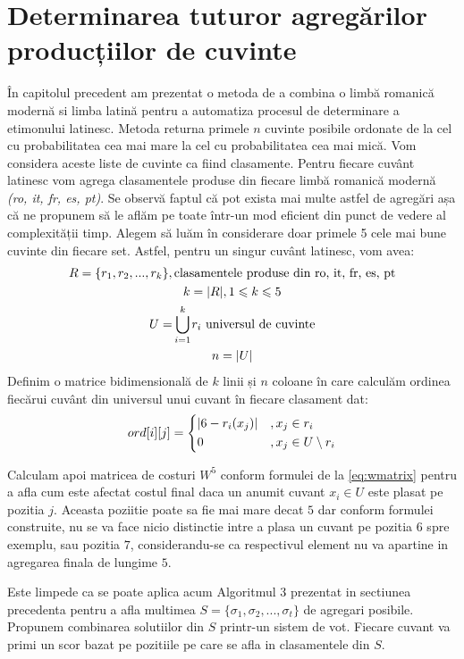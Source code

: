 \section{Determinarea tuturor agregărilor producțiilor de cuvinte}
În capitolul precedent am prezentat o metoda de a combina o limbă romanică modernă si limba latină
pentru a automatiza procesul de determinare a etimonului latinesc. Metoda returna primele $n$
cuvinte posibile ordonate de la cel cu probabilitatea cea mai mare la cel cu probabilitatea cea mai
mică. Vom considera aceste liste de cuvinte ca fiind clasamente. Pentru fiecare cuvânt latinesc vom
agrega clasamentele produse din fiecare limbă romanică modernă \textit{(ro, it, fr, es, pt)}.
Se observă faptul că pot exista mai multe astfel de agregări așa că ne propunem să le aflăm pe toate
într-un mod eficient din punct de vedere al complexității timp. Alegem să luăm în considerare
doar primele 5 cele mai bune cuvinte din fiecare set. Astfel, pentru un singur cuvânt latinesc, vom 
avea:
\begin{gather*}
  R = \{r_1, r_2, ..., r_k\}, \text{clasamentele produse din ro, it, fr, es, pt} \\
  k = |R|, 1 \leqslant k \leqslant 5 \\
  U = \smashoperator{\bigcup_{i = 1}^{k}} r_i \text{ universul de cuvinte} \\
  n = |U|
\end{gather*}
Definim o matrice bidimensională de $k$ linii și $n$ coloane în care calculăm ordinea fiecărui 
cuvânt din universul unui cuvant în fiecare clasament dat:
\[
  ord[i][j] = \begin{dcases}
    |6 - r_i(x_j)|    &, x_j \in r_i \\
    0                 &, x_j \in U \setminus r_i 
  \end{dcases}
\]

Calculam apoi matricea de costuri $W^5$ conform formulei de la \ref{eq:wmatrix} pentru a afla cum
este afectat costul final daca un anumit cuvant $x_i \in U$ este plasat pe pozitia $j$. Aceasta 
poziitie poate sa fie mai mare decat $5$ dar conform formulei construite, nu se va face nicio 
distinctie intre a plasa un cuvant pe pozitia $6$ spre exemplu, sau pozitia $7$, considerandu-se
ca respectivul element nu va apartine in agregarea finala de lungime $5$.

Este limpede ca se poate aplica acum Algoritmul 3 prezentat in sectiunea precedenta pentru a afla
multimea $S = \{\sigma_1, \sigma_2, ..., \sigma_t\}$ de agregari posibile. Propunem combinarea 
solutiilor din $S$ printr-un sistem de vot. Fiecare cuvant va primi un scor bazat pe pozitiile pe 
care se afla in clasamentele din $S$.

